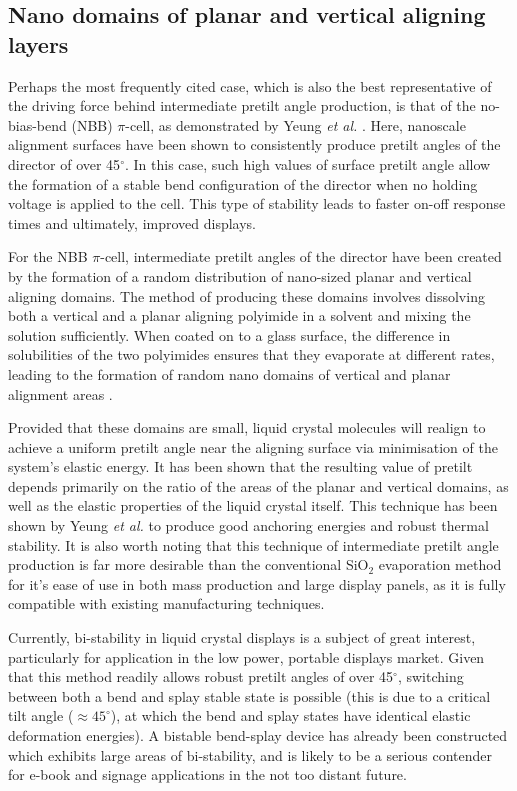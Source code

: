 \subsection{Nano domains of planar and vertical aligning layers}
\label{sec:nanodomains}
Perhaps the most frequently cited case, which is also the best representative of the driving force behind intermediate pretilt angle production, is that of the no-bias-bend (NBB) $\pi$-cell, as demonstrated by Yeung \textit{et al.} \cite{Yeung2006,Yu2004}. Here, nanoscale alignment surfaces have been shown to consistently produce pretilt angles of the director of over 45$^{\circ}$. In this case, such high values of surface pretilt angle allow the formation of a stable bend configuration of the director when no holding voltage is applied to the cell. This type of stability leads to faster on-off response times and ultimately, improved displays. 

For the NBB $\pi$-cell, intermediate pretilt angles of the director have been created by the formation of a random distribution of nano-sized planar and vertical aligning domains. The method of producing these domains involves dissolving both a vertical and a planar aligning polyimide in a solvent and mixing the solution sufficiently. When coated on to a glass surface, the difference in solubilities of the two polyimides ensures that they evaporate at different rates, leading to the formation of random nano domains of vertical and planar alignment areas \cite{Yeung2005}. 

Provided that these domains are small, liquid crystal molecules will realign to achieve a uniform pretilt angle near the aligning surface via minimisation of the system's elastic energy. It has been shown that the resulting value of pretilt depends primarily on the ratio of the areas of the planar and vertical domains, as well as the elastic properties of the liquid crystal itself. This technique has been shown by Yeung \textit{et al.} \cite{Yeung2005} to produce good anchoring energies and robust thermal stability. It is also worth noting that this technique of intermediate pretilt angle production is far more desirable than the conventional SiO$_2$ evaporation \cite{Janning1972} method for it's ease of use in both mass production and large display panels, as it is fully compatible with existing manufacturing techniques.

Currently, bi-stability in liquid crystal displays is a subject of great interest, particularly for application in the low power, portable displays market. Given that this method readily allows robust pretilt angles of over 45$^{\circ}$, switching between both a bend and splay stable state is possible (this is due to a critical tilt angle ($\approx45^{\circ}$), at which the bend and splay states have identical elastic deformation energies). A bistable bend-splay device has already been constructed which exhibits large areas of bi-stability, and is likely to be a serious contender for e-book and signage applications \cite{Yeung2005} in the not too distant future.

